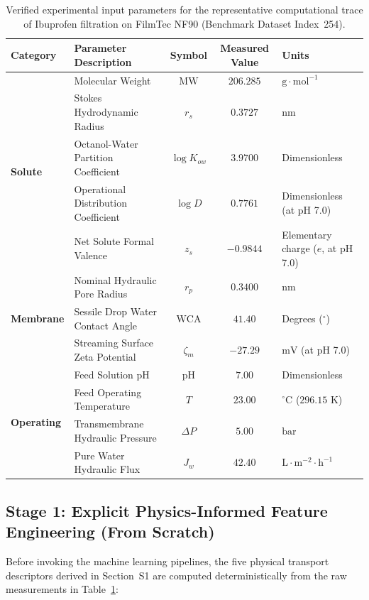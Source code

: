 \documentclass[11pt]{article}
\begin{document}
\begin{table}[H]
\centering
\small
\caption{Verified experimental input parameters for the representative computational trace of Ibuprofen filtration on FilmTec NF90 (Benchmark Dataset Index~254).}
\label{tab:s7_walkthrough_inputs}
\begin{tabular}{llccl}
\toprule
\textbf{Category} & \textbf{Parameter Description} & \textbf{Symbol} & \textbf{Measured Value} & \textbf{Units} \\
\midrule
\multirow{5}{*}{\textbf{Solute}}
& Molecular Weight & $\mathrm{MW}$ & $206.285$ & $\mathrm{g}\cdot\mathrm{mol}^{-1}$ \\
& Stokes Hydrodynamic Radius & $r_s$ & $0.3727$ & $\mathrm{nm}$ \\
& Octanol-Water Partition Coefficient & $\log K_{ow}$ & $3.9700$ & Dimensionless \\
& Operational Distribution Coefficient & $\log D$ & $0.7761$ & Dimensionless (at pH 7.0) \\
& Net Solute Formal Valence & $z_s$ & $-0.9844$ & Elementary charge ($e$, at pH 7.0) \\
\midrule
\multirow{3}{*}{\textbf{Membrane}}
& Nominal Hydraulic Pore Radius & $r_p$ & $0.3400$ & $\mathrm{nm}$ \\
& Sessile Drop Water Contact Angle & $\mathrm{WCA}$ & $41.40$ & Degrees ($^\circ$) \\
& Streaming Surface Zeta Potential & $\zeta_m$ & $-27.29$ & $\mathrm{mV}$ (at pH 7.0) \\
\midrule
\multirow{4}{*}{\textbf{Operating}}
& Feed Solution pH & $\mathrm{pH}$ & $7.00$ & Dimensionless \\
& Feed Operating Temperature & $T$ & $23.00$ & $^\circ\mathrm{C}$ ($296.15\text{ K}$) \\
& Transmembrane Hydraulic Pressure & $\Delta P$ & $5.00$ & $\mathrm{bar}$ \\
& Pure Water Hydraulic Flux & $J_w$ & $42.40$ & $\mathrm{L}\cdot\mathrm{m}^{-2}\cdot\mathrm{h}^{-1}$ \\
\bottomrule
\end{tabular}
\end{table}

\subsection{Stage 1: Explicit Physics-Informed Feature Engineering (From Scratch)}
\label{sec:walkthrough_physics}

Before invoking the machine learning pipelines, the five physical transport descriptors derived in Section~S1 are computed deterministically from the raw measurements in Table~\ref{tab:s7_walkthrough_inputs}:
\end{document}
